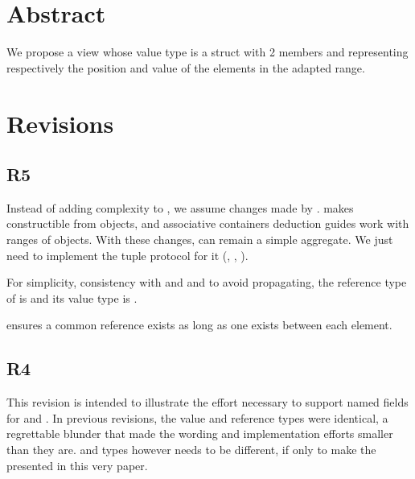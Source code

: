 \documentclass{wg21}
\title{\tcode{views::enumerate}}
\author{Corentin Jabot}{corentin.jabot@gmail.com}
\begin{document}
\maketitle


\section{Abstract}

We propose a view  whose value type is a struct with 2 members  and 
representing respectively the position and value of the elements in the adapted range.

\section{Revisions}

\subsection{R5}

Instead of adding complexity to , we assume changes made by .
 makes  constructible from  objects, and associative containers deduction guides work
with ranges of  objects.
With these changes,  can remain a simple aggregate. We just need to implement the tuple protocol for it (, , ).

For simplicity, consistency with  and  and to avoid  propagating,
the reference type of  is   and its value type is .

 ensures a common reference exists as long as one exists between each element.

\subsection{R4}

This revision is intended to illustrate the effort necessary to support named fields for  and .
In previous revisions, the value and reference types were identical, a regrettable blunder that made the wording and implementation efforts smaller than they are.
 and  types however needs to be different, if only to make the  presented in this very paper.
\end{document}
